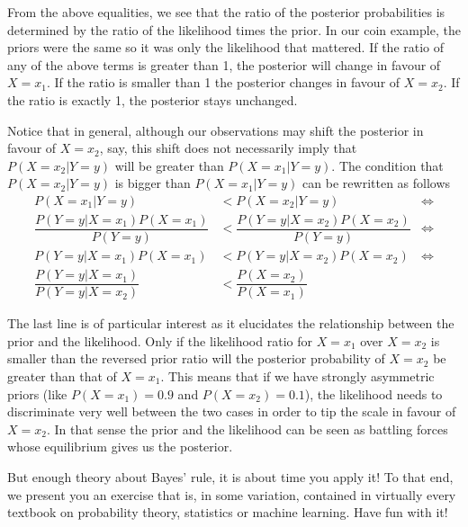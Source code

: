 From the above equalities, we see that the ratio of the posterior probabilities is determined by the ratio of the likelihood times the
prior. In our coin example, the priors were the same so it was only the likelihood that mattered. If the ratio of any of the above
terms is greater than 1, the posterior will change in favour of $ X=x_{1} $. If the ratio is smaller than 1 the posterior changes
in favour of $ X=x_{2} $. If the ratio is exactly 1, the posterior stays unchanged. 

Notice that in general, although our observations may shift the posterior in favour of $ X=x_{2} $, say, this shift does not necessarily imply that 
$ P(X=x_{2}|Y=y) $ will be greater than $ P(X=x_{1}|Y=y) $. The condition that $ P(X=x_{2}|Y=y) $ is bigger than  $ P(X=x_{1}|Y=y) $ can be rewritten as follows
\begin{align*}
P(X=x_{1}|Y=y) &< P(X=x_{2}|Y=y)  &\Leftrightarrow \\
\dfrac{P(Y=y|X=x_{1})P(X=x_{1})}{P(Y=y)} &< \dfrac{P(Y=y|X=x_{2})P(X=x_{2})}{P(Y=y)} &\Leftrightarrow \\
P(Y=y|X=x_{1})P(X=x_{1}) &< P(Y=y|X=x_{2})P(X=x_{2}) &\Leftrightarrow \\
\dfrac{P(Y=y|X=x_{1})}{P(Y=y|X=x_{2})} &< \dfrac{P(X=x_{2})}{P(X=x_{1})}
\end{align*} 

The last line is of particular interest as it elucidates the relationship between the prior and the likelihood. Only if the likelihood
ratio for $ X=x_{1} $ over $ X=x_{2} $ is smaller than the reversed prior ratio will the posterior probability of $ X=x_{2} $
be greater than that of $ X=x_{1} $. This means that if we have strongly asymmetric priors (like $ P(X=x_{1}) = 0.9 $
and $ P(X=x_{2}) = 0.1 $), the likelihood needs to discriminate very well between the two cases in order to tip the scale in
favour of $ X=x_{2} $. In that sense the prior and the likelihood can be seen as battling forces whose equilibrium gives us 
the posterior.

But enough theory about Bayes' rule, it is about time you apply it! To that end, we present you an exercise that is, in some variation,
contained in virtually every textbook on probability theory, statistics or machine learning. Have fun with it!

